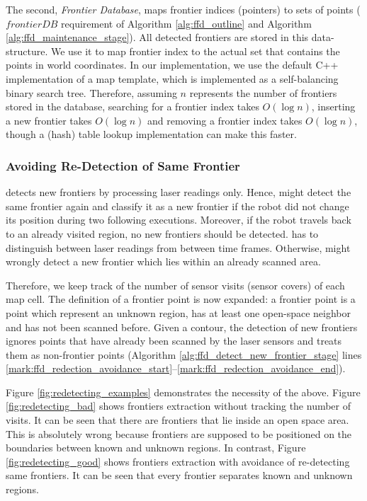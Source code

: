 	The second, \emph{Frontier Database}, maps frontier
	indices (pointers) to sets of points ($frontierDB$ requirement of Algorithm
	\ref{alg:ffd_outline} and Algorithm \ref{alg:ffd_maintenance_stage}).
	All detected frontiers are stored in this data-structure. We use it to map frontier index to the actual set that
	contains the points in world coordinates. In our implementation, we use the
	default C++ implementation of a map template, which is implemented as a
	self-balancing binary search tree.
	Therefore, assuming $n$ represents the number of frontiers stored in the
	database, searching for a frontier index takes $O(\log n)$, inserting a new
	frontier takes $O(\log n)$ and removing a frontier index takes $O(\log n)$,
	though a (hash) table lookup implementation can make this faster.

	\subsubsection{Avoiding Re-Detection of Same Frontier}
	\label{section:avoiding_redetection}
	\FFD detects new frontiers by processing laser readings only.
	Hence, \FFD might detect the same frontier again and classify it as a new
	frontier if the robot did not change its position during two following \FFD
	executions. Moreover, if the robot travels back to an already visited
	region, no new frontiers should be detected. \FFD has to distinguish between
	laser readings from  between time frames. Otherwise, \FFD might wrongly detect
	a new frontier which lies within an already scanned area.

	Therefore, we keep track of the number of sensor visits (sensor covers) of each map cell. The
	definition of a frontier point is now expanded: a frontier point is a point
	which represent an unknown region, has at least one open-space neighbor and has
	not been scanned before. Given a contour, the detection of new frontiers ignores
	points that have already been scanned by the laser sensors and treats them as
	non-frontier points (Algorithm \ref{alg:ffd_detect_new_frontier_stage} lines
	\ref{mark:ffd_redection_avoidance_start}--\ref{mark:ffd_redection_avoidance_end}).

	Figure \ref{fig:redetecting_examples} demonstrates the necessity of the above.
	Figure \ref{fig:redetecting_bad} shows frontiers extraction
	without tracking the number of visits. It can be seen that there are frontiers that lie inside
	an open space area. This is absolutely wrong because frontiers are supposed to
	be positioned on the boundaries between known and unknown regions. In
	contrast, Figure \ref{fig:redetecting_good} shows frontiers extraction with
	avoidance of re-detecting same frontiers. It can be seen that every frontier
	separates known and unknown regions.
	
